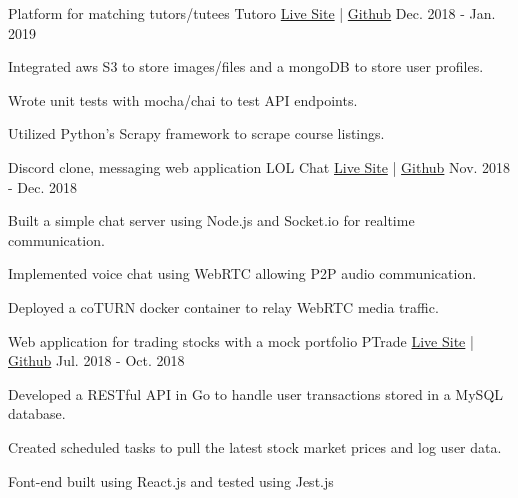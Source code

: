 

\begin{cventries}

  \cventry
    {Platform for matching tutors/tutees} %
    {Tutoro} %
    {
      \href{https://tutoro-uw.herokuapp.com}{Live Site} | 
      \href{https://github.com/bernardjkim/tutoro}{Github}
    } %
    {Dec. 2018 - Jan. 2019} %
    {
      \begin{cvitems} %
        \item {Integrated aws S3 to store images/files and a mongoDB to store user profiles.}
        \item {Wrote unit tests with mocha/chai to test API endpoints.}
        \item {Utilized Python's Scrapy framework to scrape course listings.}
      \end{cvitems}
    }

  \cventry
    {Discord clone, messaging web application} %
    {LOL Chat} %
    {
      \href{https://lol-chatt.herokuapp.com}{Live Site} | 
      \href{https://github.com/bernardjkim/lol-chat}{Github}
    } %
    {Nov. 2018 - Dec. 2018} %
    {
      \begin{cvitems} %
        \item {Built a simple chat server using Node.js and Socket.io for realtime communication.}
        \item {Implemented voice chat using WebRTC allowing P2P audio communication.}
        \item {Deployed a coTURN docker container to relay WebRTC media traffic.}
      \end{cvitems}
    }

  \cventry
    {Web application for trading stocks with a mock portfolio} %
    {PTrade} %
    {
      \href{https://p-trade.herokuapp.com}{Live Site} | 
      \href{https://github.com/bernardjkim/ptrade}{Github}
    } %
    {Jul. 2018 - Oct. 2018} %
    {
      \begin{cvitems} %
        \item {Developed a RESTful API in Go to handle user transactions stored in a MySQL database.}
        \item {Created scheduled tasks to pull the latest stock market prices and log user data.}
        \item {Font-end built using React.js and tested using Jest.js}
      \end{cvitems}
    }


\end{cventries}

